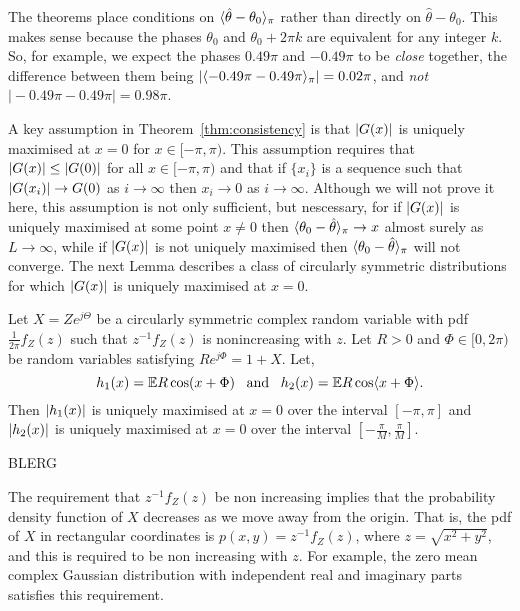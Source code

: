 \documentclass[journal]{IEEEtran}
\begin{document}
The theorems place conditions on $\langle \hat{\theta} - \theta_0 \rangle_\pi$ rather than directly on $\hat{\theta} - \theta_0$.  This makes sense because the phases $\theta_0$ and $\theta_0 + 2\pi k$ are equivalent for any integer $k$. So, for example, we expect the phases $0.49\pi$ and $-0.49\pi$ to be \emph{close} together, the difference between them being $\vert\langle -0.49\pi - 0.49\pi \rangle_\pi\vert = 0.02\pi$, and \emph{not} $\vert -0.49\pi - 0.49\pi\vert = 0.98\pi$.

A key assumption in Theorem~\ref{thm:consistency} is that ${\left\vert G(x) \right\vert}$ is uniquely maximised at $x = 0$ for $x \in [-\pi, \pi)$.  This assumption requires that ${\left\vert G(x) \right\vert} \leq {\left\vert G(0) \right\vert}$ for all $x \in [-\pi, \pi)$ and that if $\{x_i\}$ is a sequence such that ${\left\vert G(x_i) \right\vert} \rightarrow G(0)$ as $i \rightarrow \infty$ then $x_i \rightarrow 0$ as $i \rightarrow \infty$.  Although we will not prove it here, this assumption is not only sufficient, but nescessary, for if ${\left\vert G(x) \right\vert}$ is uniquely maximised at some point $x \neq 0$ then $\langle \theta_0 - \hat{\theta} \rangle_\pi \rightarrow x$ almost surely as $L\rightarrow\infty$, while if ${\left\vert G(x) \right\vert}$ is not uniquely maximised then $\langle \theta_0 - \hat{\theta} \rangle_\pi$ will not converge.  The next Lemma describes a class of circularly symmetric distributions for which ${\left\vert G(x) \right\vert}$ is uniquely maximised at $x = 0$.

\begin{lemma}
Let $X = Z e^{j\Theta}$ be a circularly symmetric complex random variable with pdf $\tfrac{1}{2\pi}f_Z(z)$ such that $z^{-1} f_Z(z)$ is nonincreasing with $z$.  Let $R > 0$ and $\Phi \in [0, 2\pi)$ be random variables satisfying $R e^{j\Phi} = 1 + X$.  Let,
\[
h_1(x) = {\mathbb E} R \cos(x + \Phi) \;\;\; \text{and} \;\;\; h_2(x) =  {\mathbb E} R \cos\langle  x + \Phi \rangle.
\]
Then ${\left\vert h_1(x) \right\vert}$ is uniquely maximised at $x=0$ over the interval $[-\pi,\pi]$ and ${\left\vert h_2(x) \right\vert}$ is uniquely maximised at $x = 0$ over the interval $[-\tfrac{\pi}{M},\tfrac{\pi}{M}]$.
\end{lemma}
\begin{IEEEproof}
BLERG
\end{IEEEproof}

The requirement that $z^{-1}f_{Z}(z)$ be non increasing implies that the probability density function of $X$ decreases as we move away from the origin. That is, the pdf of $X$ in rectangular coordinates is $p(x,y) = z^{-1}f_{Z}(z)$, where $z = \sqrt{x^2 + y^2}$, and this is required to be non increasing with $z$.  For example, the zero mean complex Gaussian distribution with independent real and imaginary parts satisfies this requirement.
\end{document}
